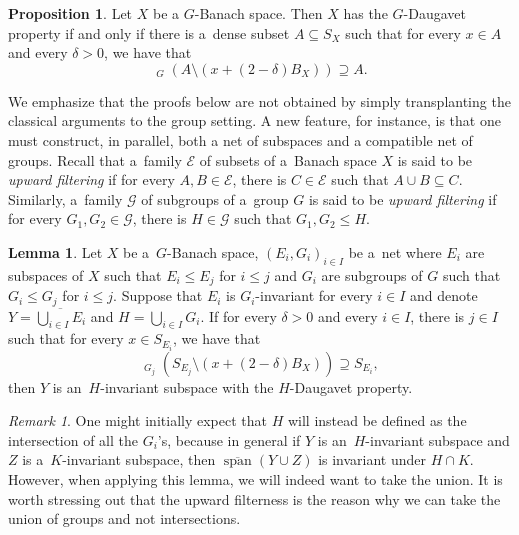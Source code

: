 \documentclass[a4paper,12pt]{amsart}
\theoremstyle{definition}
\newtheorem{lemma}[theorem]{Lemma}
\newtheorem{proposition}[theorem]{Proposition}
\theoremstyle{definition}
\theoremstyle{remark}
\newtheorem{remark}[theorem]{Remark}
\numberwithin{equation}{section}
\newcommand{\clco}{\mathop{\overline{\mathrm{co}}}\nolimits}
\renewcommand{\leq}{\leqslant}
\newcommand{\<}{\langle}
\renewcommand{\>}{\rangle}
\newcommand{\clspan}{\overline{\operatorname{span}}}
\begin{document}
	\begin{proposition} \label{prop:denseSubsetG-DP}
		Let $X$ be a $G$-Banach space. Then $X$ has the $G$-Daugavet property if and only if there is a~dense subset $A \subseteq S_X$ such that for every $x \in A$ and every $\delta > 0$, we have that
		\begin{equation*}
			\clco_G(A \setminus (x + (2 - \delta) B_X)) \supseteq A.
		\end{equation*}
	\end{proposition}
	
	We emphasize that the proofs below are not obtained by simply transplanting the classical arguments to the group setting. A new feature, for instance, is that one must construct, in parallel, both a net of subspaces and a compatible net of groups. Recall that a~family $\mathcal{E}$ of subsets of a~Banach space $X$ is said to be \emph{upward filtering} if for every $A, B \in \mathcal{E}$, there is $C \in \mathcal{E}$ such that $A \cup B \subseteq C$. Similarly, a~family $\mathcal{G}$ of subgroups of a~group $G$ is said to be \emph{upward filtering} if for every $G_1, G_2 \in \mathcal{G}$, there is $H \in \mathcal{G}$ such that $G_1, G_2 \leq H$.
	
	\begin{lemma} \label{lem:sepDeterminationLemma}
		Let $X$ be a~$G$-Banach space, $(E_i, G_i)_{i \in I}$ be a~net where $E_i$ are subspaces of $X$ such that $E_i \leq E_j$ for $i \leq j$ and $G_i$ are subgroups of $G$ such that $G_i \leq G_j$ for $i \leq j$. Suppose that $E_i$ is $G_i$-invariant for every $i \in I$ and denote $Y = \overline{\bigcup_{i \in I} E_i}$ and $H = \bigcup_{i \in I} G_i$. If for every $\delta > 0$ and every $i \in I$, there is $j \in I$ such that for every $x \in S_{E_i}$, we have that
		\begin{equation*}
			\clco_{G_j}(S_{E_j} \setminus (x + (2 - \delta) B_{X})) \supseteq S_{E_i},
		\end{equation*}
		then $Y$ is an~$H$-invariant subspace with the $H$-Daugavet property.
	\end{lemma}
	
	
	\begin{remark}
		One might initially expect that $H$ will instead be defined as the intersection of all the $G_i$'s, because in general if $Y$ is an~$H$-invariant subspace and $Z$ is a~$K$-invariant subspace, then $\clspan(Y \cup Z)$ is invariant under $H \cap K$.
		However, when applying this lemma, we will indeed want to take the union. It is worth stressing out that the upward filterness is
		the reason why we can take the union of groups and not intersections.
	\end{remark}
	
\end{document}
